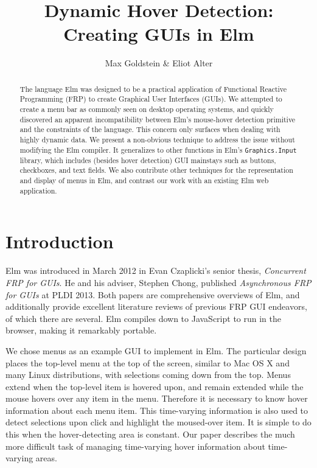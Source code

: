 \documentclass{article}
\title{\textbf{Dynamic Hover Detection:\\Creating GUIs in Elm}}
\author{Max Goldstein \& Eliot Alter}
\makeatletter
\renewcommand{\maketitle}{ %
    \begin{flushright} %
        {\LARGE\@title} %

        \vspace{40pt} %

        {\large\@author} %

        \vspace{30pt} %
    \end{flushright}
}
\makeatother
\begin{document}
\thispagestyle{empty} %
\maketitle

\begin{abstract}
The language Elm was designed to be a practical application of
Functional Reactive Programming (FRP) to create Graphical User
Interfaces (GUIs). We attempted to create a menu bar as commonly seen on
desktop operating systems, and quickly discovered an apparent
incompatibility between Elm's mouse-hover detection primitive and the
constraints of the language. This concern only surfaces when dealing
with highly dynamic data. We present a non-obvious technique to address
the issue without modifying the Elm compiler. It generalizes to other
functions in Elm's \texttt{Graphics.Input} library, which includes
(besides hover detection) GUI mainstays such as buttons, checkboxes, and
text fields. We also contribute other techniques for the representation and
display of menus in Elm, and contrast our work with an existing Elm web
application.
\end{abstract}

\section{Introduction}\label{introduction}

Elm was introduced in March 2012 in Evan Czaplicki's senior thesis,
\emph{Concurrent FRP for GUIs}. He and his adviser, Stephen Chong,
published \emph{Asynchronous FRP for GUIs} at PLDI 2013. Both papers are
comprehensive overviews of Elm, and additionally provide excellent
literature reviews of previous FRP GUI endeavors, of which there are
several. Elm compiles down to JavaScript to run in the browser, making
it remarkably portable.

We chose menus as an example GUI to implement in Elm. The particular
design places the top-level menu at the top of the screen, similar to
Mac OS X and many Linux distributions, with selections coming down from
the top. Menus extend when the top-level item is hovered upon, and
remain extended while the mouse hovers over any item in the menu.
Therefore it is necessary to know hover information about each menu
item. This time-varying information is also used to detect selections
upon click and highlight the moused-over item. It is simple to do this
when the hover-detecting area is constant. Our paper describes the much
more difficult task of managing time-varying hover information about
time-varying areas.
\end{document}
